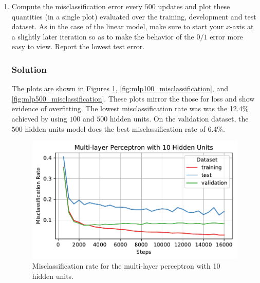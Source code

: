 \documentclass[letterpaper,11pt]{article}
\begin{document}
\begin{enumerate}
  \item Compute the misclassification error every $500$ updates and plot these
    quantities (in a single plot) evaluated over the training, development and
    test dataset. As in the case of the linear model, make sure to start your
    $x$-axis at a slightly later iteration so as to make the behavior of the
    $0/1$ error more easy to view. Report the lowest test error.   

    \subsubsection*{Solution}
    

    The plots are shown in Figures \ref{fig:mlp10_misclassification},
    \ref{fig:mlp100_misclassification}, and
    \ref{fig:mlp500_misclassification}. These plots mirror the those for loss
    and show evidence of overfitting. The lowest misclassification rate was was
    the 12.4\% achieved by using $100$ and $500$ hidden units. On the validation
    dataset, the $500$ hidden units model does the best misclassification rate
    of 6.4\%.

    \begin{figure}
      \centering
      \includegraphics{problem6/mlp10_misclassification.pdf}
      \caption{Misclassification rate for the multi-layer perceptron with 10 hidden units.}
      \label{fig:mlp10_misclassification}
    \end{figure}
    

\end{enumerate}
\end{document}

